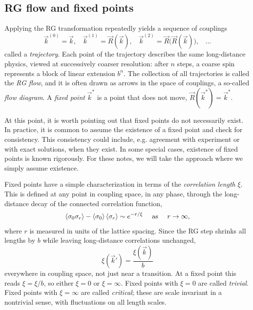 \subsection{RG flow and fixed points}\label{sec:fixedPoints}

Applying the RG transformation repeatedly yields a sequence of couplings
\begin{equation}
  \vec{k}^{(0)}=\vec{k},~~~~\vec{k}^{(1)}=\vec{R}(\vec{k}),~~~~
  \vec{k}^{(2)}=\vec{R}\big(\vec{R}(\vec{k})\big),~~~~...
\end{equation}
called a {\it trajectory}. Each point of the trajectory
describes the same long-distance physics, viewed at successively coarser
resolution: after $n$ steps, a coarse spin represents a block of linear
extension $b^n$. The collection of all trajectories is called the
{\it RG flow}, and it is often drawn as arrows in the space of
couplings, a so-called {\it flow diagram}. A
{\it fixed point} $\vec{k}^*$ is a point that does not
move, $\vec{R}(\vec{k}^*)=\vec{k}^*$.

At this point, it is worth pointing out that fixed points do not necessarily
exist. In practice, it is common to assume the existence of a fixed point and
check for consistency. This consistency could include, e.g. agreement with
experiment or with exact solutions, when they exist. In some special cases,
existence of fixed points is known rigorously. For these notes, we will take the
approach where we simply assume existence.

Fixed points have a simple characterization in terms of the
{\it correlation length} $\xi$. This is defined at any
point in coupling space, in any phase, through the long-distance decay of the
connected correlation function,
\begin{equation}
  \ev{\sigma_0\sigma_r}-\ev{\sigma_0}\ev{\sigma_r}\sim e^{-r/\xi}
  ~~~~\text{as}~~~~r\to\infty,
\end{equation}
where $r$ is measured in units of the lattice spacing. Since the RG step shrinks
all lengths by $b$ while leaving long-distance correlations unchanged,
\begin{equation}\label{eq:RGxi}
  \xi(\vec{k}')=\frac{\xi(\vec{k})}{b}
\end{equation}
everywhere in coupling space, not just near a transition. At a fixed point this
reads $\xi=\xi/b$, so either $\xi=0$ or $\xi=\infty$. Fixed points with $\xi=0$
are called {\it trivial}. Fixed points with $\xi=\infty$ are called
{\it critical}; these are scale invariant in a nontrivial sense, with
fluctuations on all length scales.

